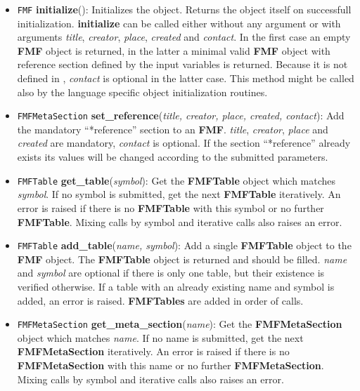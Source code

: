 \documentclass[10pt,utf8, mainlanguage=english]{ufcd-info}
\newcommand{\fret}[1]{{\texttt{#1}}}
\newcommand{\fcal}[2]{{\textbf{#1}}(\textit{#2})}
\newcommand{\fmfattr}[1]{{\textbf{#1}}}
\newcommand{\fmfobj}[1]{{\textbf{\textsf{#1}}}}
\begin{document}
\begin{itemize}
	\item \fret{FMF} \fcal{initialize}{}: Initializes the object. Returns the object itself on successfull initialization. \fmfattr{initialize} can be called either without any argument or with arguments \textit{title}, \textit{creator}, \textit{place}, \textit{created} and \textit{contact}. In the first case an empty \fmfobj{FMF} object is returned, in the latter a minimal valid \fmfobj{FMF} object with reference section defined by the input variables is returned. Because it is not defined in \cite{RiedeCPC181_2010}, \textit{contact} is optional in the latter case. This method might be called also by the language specific object initialization routines.

	\item \fret{FMFMetaSection} \fcal{set\_reference}{title, creator, place, created, contact}: Add the mandatory \enquote{*reference} section to an \fmfobj{FMF}. \textit{title}, \textit{creator}, \textit{place} and \textit{created} are mandatory, \textit{contact} is optional. If the section \enquote{*reference} already exists its values will be changed according to the submitted parameters.

	\item \fret{FMFTable} \fcal{get\_table}{symbol}: Get the \fmfobj{FMFTable} object which matches \textit{symbol}. If no symbol is submitted, get the next \fmfobj{FMFTable} iteratively. An error is raised if there is no \fmfobj{FMFTable} with this symbol or no further \fmfobj{FMFTable}. Mixing calls by symbol and iterative calls also raises an error.

	\item \fret{FMFTable} \fcal{add\_table}{name, symbol}: Add a single \fmfobj{FMFTable} object to the \fmfobj{FMF} object. The \fmfobj{FMFTable} object is returned and should be filled. \textit{name} and \textit{symbol} are optional  if there is only one table, but their existence is verified otherwise. If a table with an already existing name and symbol is added, an error is raised. \fmfobj{FMFTables} are added in order of calls.

	\item \fret{FMFMetaSection} \fcal{get\_meta\_section}{name}: Get the \fmfobj{FMFMetaSection} object which matches \textit{name}. If no name is submitted, get the next \fmfobj{FMFMetaSection} iteratively. An error is raised if there is no \fmfobj{FMFMetaSection} with this name or no further \fmfobj{FMFMetaSection}. Mixing calls by symbol and iterative calls also raises an error.


\end{itemize}
\end{document}
